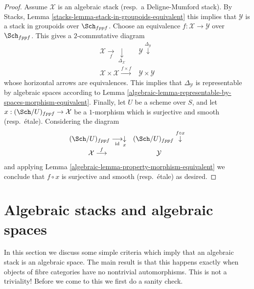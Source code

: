 \begin{proof}

Assume $\mathcal{X}$ is an algebraic stack (resp.\ a Deligne-Mumford stack). By
Stacks, Lemma \ref{stacks-lemma-stack-in-groupoids-equivalent}
this implies that $\mathcal{Y}$ is a stack in groupoids over
$\Sch_{fppf}$. Choose an equivalence $f : \mathcal{X} \to \mathcal{Y}$
over $\Sch_{fppf}$. This gives a $2$-commutative diagram
$$
\begin{array}{cc}\mathcal{X} \underset{f}{\longrightarrow}\underset{\Delta_\mathcal{X}}{\downarrow} & \mathcal{Y} \overset{\Delta_\mathcal{Y}}{\downarrow} \\ \mathcal{X} \times \mathcal{X} \overset{f \times f}{\longrightarrow} & \mathcal{Y} \times \mathcal{Y}\end{array}
$$
whose horizontal arrows are equivalences. This implies that
$\Delta_\mathcal{Y}$ is representable by algebraic spaces according to
Lemma \ref{algebraic-lemma-representable-by-spaces-morphism-equivalent}.
Finally, let $U$ be a scheme over $S$, and let
$x : (\Sch/U)_{fppf} \to \mathcal{X}$ be a $1$-morphism which
is surjective and smooth (resp.\ \'etale). Considering the diagram
$$
\begin{array}{cc}(\Sch/U)_{fppf} \underset{\text{id}}{\longrightarrow}\underset{x}{\downarrow} & (\Sch/U)_{fppf} \overset{f \circ x}{\downarrow} \\ \mathcal{X} \overset{f}{\longrightarrow} & \mathcal{Y}\end{array}
$$
and applying
Lemma \ref{algebraic-lemma-property-morphism-equivalent}
we conclude that $f \circ x$ is surjective and smooth (resp.\ \'etale)
as desired.
\end{proof}

\section{Algebraic stacks and algebraic spaces}
\label{algebraic-section-stacks-spaces}
In this section we discuss some simple criteria which imply that an
algebraic stack is an algebraic space. The main result is that this
happens exactly when objects of fibre categories have no nontrivial
automorphisms. This is not a triviality! Before we come to this
we first do a sanity check.

